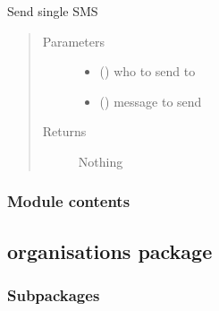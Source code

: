 \documentclass[letterpaper,10pt,english]{sphinxmanual}
\begin{document}

\begin{fulllineitems}
\label{\detokenize{notifications:notifications.views.send_cobalt_sms}}
Send single SMS
\begin{quote}\begin{description}
\item[{Parameters}] \leavevmode\begin{itemize}
\item {} 
 () \textendash{} who to send to

\item {} 
 () \textendash{} message to send

\end{itemize}

\item[{Returns}] \leavevmode
Nothing

\end{description}\end{quote}

\end{fulllineitems}



\subsubsection{Module contents}
\label{\detokenize{notifications:module-notifications}}\label{\detokenize{notifications:module-contents}}

\subsection{organisations package}
\label{\detokenize{organisations:organisations-package}}\label{\detokenize{organisations::doc}}

\subsubsection{Subpackages}
\label{\detokenize{organisations:subpackages}}
\end{document}
